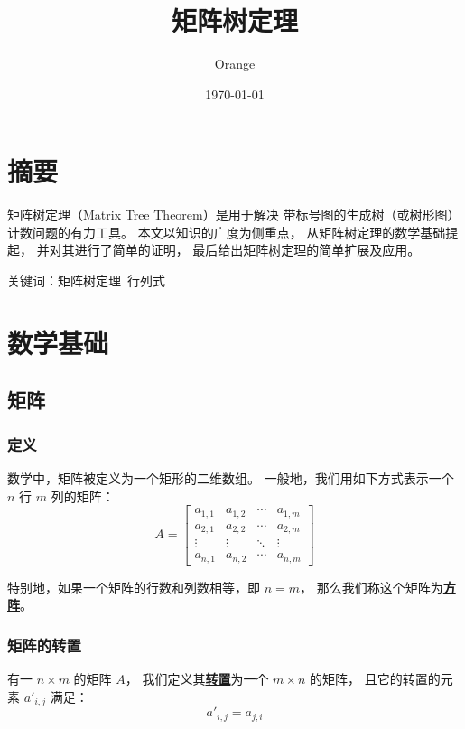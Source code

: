 \documentclass[UTF8]{article}
\title{矩阵树定理}
\author{Orange}
\date{\today}
\begin{document}
	\maketitle

	\section{摘要}

	矩阵树定理（Matrix Tree Theorem）是用于解决
	带标号图的生成树（或树形图）计数问题的有力工具。
	本文以知识的广度为侧重点，
	从矩阵树定理的数学基础提起，
	并对其进行了简单的证明，
	最后给出矩阵树定理的简单扩展及应用。

	\bigskip

	关键词：矩阵树定理~行列式

	\section{数学基础}

	\subsection{矩阵}

	\subsubsection{定义}

	数学中，矩阵被定义为一个矩形的二维数组。
	一般地，我们用如下方式表示一个 $n$ 行 $m$ 列的矩阵：
	\begin{equation*}
		A =
		\begin{bmatrix}
			a_{1, 1} & a_{1, 2} & \cdots & a_{1, m}
			\\
			a_{2, 1} & a_{2, 2} & \cdots & a_{2, m}
			\\
			\vdots & \vdots & \ddots & \vdots
			\\
			a_{n, 1} & a_{n, 2} & \cdots & a_{n, m}
		\end{bmatrix}
	\end{equation*}

	特别地，如果一个矩阵的行数和列数相等，即 $n = m$，
	那么我们称这个矩阵为\textbf{\uline{方阵}}。

	\subsubsection{矩阵的转置}

	有一 $n \times m$ 的矩阵 $A$，
	我们定义其\textbf{\uline{转置}}为一个 $m \times n$ 的矩阵，
	且它的转置的元素 $a'_{i, j}$ 满足：
	$$
	a'_{i, j} = a_{j, i}
	$$
\end{document}
